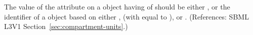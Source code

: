 The value of the attribute  on a \Compartment object having
 of  should be either 
, or the identifier of a \UnitDefinition object based on either
,  (with  equal to ), or
.  (References: SBML L3V1
Section~\ref{sec:compartment-units}.)
